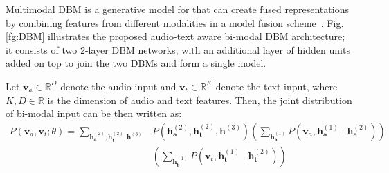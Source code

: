 \documentclass{llncs}
\begin{document}
Multimodal DBM is a generative model for that can create fused representations by combining features from different modalities in a model fusion scheme~\cite{DBLP:journals/jmlr/SrivastavaS14}. %
Fig. \ref{fg:DBM} illustrates the proposed audio-text aware bi-modal DBM architecture; it consists of two 2-layer DBM networks, with an additional layer of hidden units added on top to join the two DBMs and form a single model. 

Let $\mathbf{v}_{a}\in\mathbb{R}^{D}$ denote the audio input and $\mathbf{v}_{t}\in\mathbb{R}^{K}$ denote the text input, where $K,D\in\mathbb{R}$ is the dimension of audio and text features. Then, the joint distribution of bi-modal input can be then written as:
\begin{equation}\label{eq3}
\begin{split}
P(\mathbf{v}_{a},\mathbf{v}_{t};\theta)=\sum_{\mathbf{h}_{\mathbf{a}}^{(2)},\mathbf{h}_{\mathbf{t}}^{(2)},\mathbf{h}^{(3)}} &P(\mathbf{h}_{\mathbf{a}}^{(2)},\mathbf{h}_{\mathbf{t}}^{(2)},\mathbf{h}^{(3)})\left(\sum_{\mathbf{h}_{\mathbf{a}}^{(1)}}P(\mathbf{v}_{a},\mathbf{h}_{\mathbf{a}}^{(1)}\mid \mathbf{h}_{\mathbf{a}}^{(2)})\right) \\
& \left(\sum_{\mathbf{h}_{\mathbf{t}}^{(1)}}P(\mathbf{v}_{t},\mathbf{h}_{\mathbf{t}}^{(1)}\mid \mathbf{h}_{\mathbf{t}}^{(2)})\right)
\end{split}
\end{equation}
\end{document}
